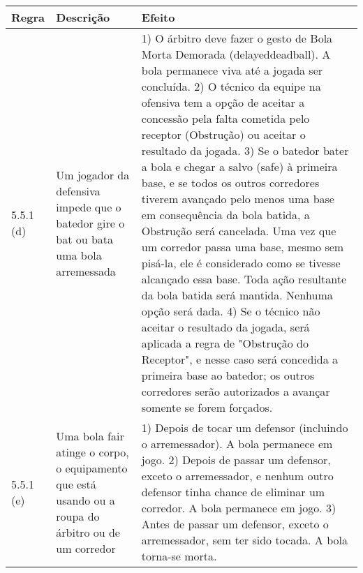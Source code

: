 {\footnotesize\begin{tabular}{p{15mm}p{60mm}p{90mm}}
		Regra& Descrição & Efeito\\\hline

		5.5.1 (d) & Um jogador da defensiva impede que o batedor gire o \gls{bat} ou bata uma bola arremessada

		&

		1) O árbitro deve fazer o gesto de Bola Morta Demorada (\gls{delayeddeadball}).
		A bola permanece viva até a jogada ser concluída.
		2) O técnico da equipe na ofensiva tem a opção de aceitar a concessão pela falta cometida pelo receptor (Obstrução) ou aceitar o resultado da jogada.
		3) Se o batedor bater a bola e chegar a salvo (\gls{safe}) à primeira base, e se todos os outros corredores tiverem avançado pelo menos uma base em consequência da bola batida, a Obstrução será cancelada. Uma vez que um corredor passa uma base, mesmo sem pisá-la, ele é considerado como se tivesse alcançado essa base. Toda ação resultante da bola batida será mantida. Nenhuma opção será dada.
		4) Se o técnico não aceitar o resultado da jogada, será aplicada a regra de "Obstrução do Receptor", e nesse caso será concedida a primeira base ao batedor; os outros corredores serão autorizados a avançar somente se forem forçados.

		\\ 5.5.1 (e) & Uma bola \gls{fair} atinge o corpo, o equipamento que está usando ou a roupa do árbitro ou de um corredor

		&

		1) Depois de tocar um defensor (incluindo o arremessador). A bola permanece em jogo.
		2) Depois de passar um defensor, exceto o arremessador, e nenhum outro defensor tinha chance de eliminar um corredor. A bola permanece em jogo.
		3) Antes de passar um defensor, exceto o arremessador, sem ter sido tocada. A bola torna-se morta.
\end{tabular}}

